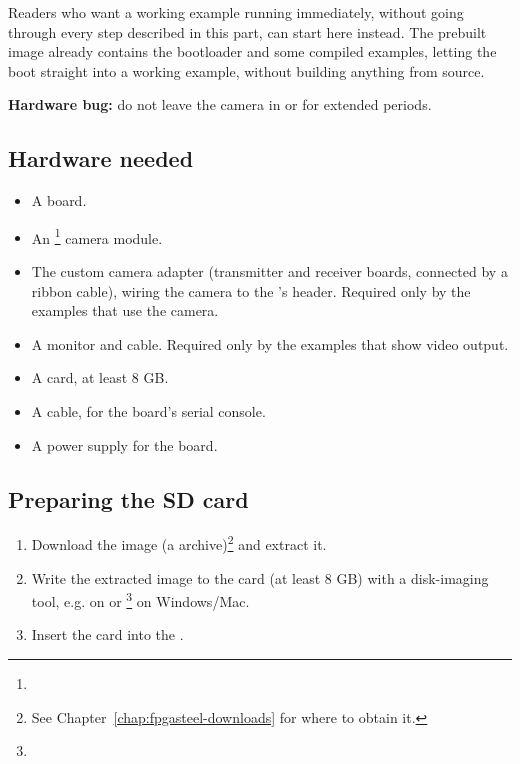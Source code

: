 Readers who want a working example running immediately, without going through every step described in this part, can start here instead. The prebuilt  image already contains the bootloader and some compiled examples, letting the  boot straight into a working example, without building anything from source.

\begin{warningbox}
\textbf{Hardware bug:} do not leave the camera in  or  for extended periods.\footnotemark
\end{warningbox}

\subsection{Hardware needed}

\begin{itemize}
    \item A  board.
    \item An \footnote{} camera module.
    \item The custom camera adapter (transmitter and receiver boards, connected by a ribbon cable), wiring the camera to the 's  header. Required only by the examples that use the camera.
    \item A  monitor and cable. Required only by the examples that show video output.
    \item A  card, at least 8 GB.
    \item A  cable, for the board's serial console.
    \item A power supply for the board.
\end{itemize}

\subsection{Preparing the SD card}

\begin{enumerate}
    \item Download the  image (a  archive)\footnote{See Chapter~\ref{chap:fpgasteel-downloads} for where to obtain it.} and extract it.
    \item Write the extracted image to the  card (at least 8 GB) with a disk-imaging tool, e.g.  on  or \footnote{} on Windows/Mac.
    \item Insert the card into the .
\end{enumerate}

